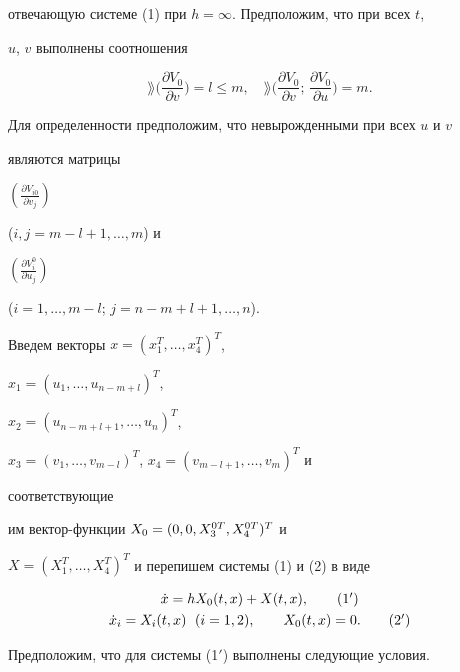 отвечающую системе (1) при $h=\infty$. Предположим, что при всех $t$, 


$u$, $v$ выполнены соотношения 


\begin{equation} 


\rang\biggl(\frac{\partial V_0}{\partial v} \biggr)=l\le m,\quad 


\rang\biggl(\frac{\partial V_0}{\partial v};\, 


\frac{\partial V_0}{\partial u}\biggr)=m. 


\end{equation} 


Для определенности предположим, что невырожденными при всех $u$ и $v$ 


являются матрицы 


$\left(\frac{\partial V_{i0}}{\partial v_j}\right)$ 


($i,j=m-l+1,\dotsc,m$) и 


$\left(\frac{\partial V^0_i}{\partial u_j}\right)$ 


($i=1,\dotsc,m-l$; $j=n-m+l+1,\dotsc,n$). 


 


Введем векторы $x=(x^T_1,\dotsc,x^T_4)^T$, 


$x_1=(u_1,\dotsc,u_{n-m+l})^T$, 


$x_2=(u_{n-m+l+1},\dotsc,u_n)^T$, 


$x_3=(v_1,\dotsc,v_{m-l})^T$, $x_4=(v_{m-l+1},\dotsc,v_m)^T$ и 


соответствующие 


им вектор-функции $X_0=(0,0,\linebreak X^{0T}_3,X^{0T}_4)^T$ и 


$X=(X^T_1,\dotsc,X^T_4)^T$ и перепишем системы (1) и (2) в виде 


\begin{gather} 


\Dot x=hX_0(t,x)+X(t,x),\tag{1${}'$} \\ 


\Dot x_i=X_i(t,x) \ \; (i=1,2),\qquad X_0(t,x)=0. 


\tag{2${}'$} 


\end{gather} 


Предположим, что для системы (1${}'$) выполнены следующие условия. 


\medskip 


 



